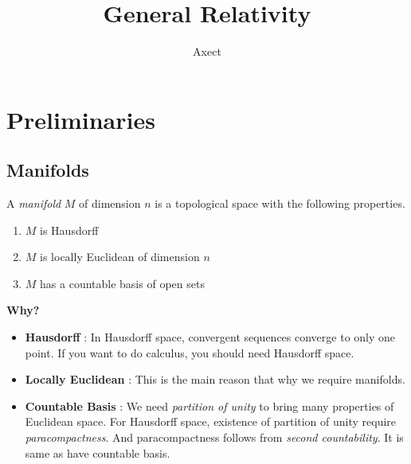 \documentclass[final]{IEEEphot}
\begin{document}
\title{General Relativity \\
\VS
{}}

\author{Axect}


\maketitle

\tableofcontents

\newpage

\section[Preliminaries]{Preliminaries}

\subsection{Manifolds}

\vs

\begin{tcolorbox}[colback=white!5!white,colframe=white!50!black, title=\textbf{Def 1.1 } Topological Manifolds]
  A \textit{manifold} $M$ of dimension $n$ is a topological space with the following properties.
  \begin{enumerate}
    \item $M$ is Hausdorff
    \item $M$ is locally Euclidean of dimension $n$
    \item $M$ has a countable basis of open sets
  \end{enumerate}
\end{tcolorbox}

\textbf{Why?}

\begin{itemize}
  \item \textbf{Hausdorff} : In Hausdorff space, convergent sequences converge to only one point.
  If you want to do calculus, you should need Hausdorff space.
  \item \textbf{Locally Euclidean} : This is the main reason that why we require manifolds.
  \item \textbf{Countable Basis} : We need \textit{partition of unity} to bring many properties of Euclidean space.
  For Hausdorff space, existence of partition of unity require \textit{paracompactness}.
  And paracompactness follows from \textit{second countability}. It is same as have countable basis.
\end{itemize}
\end{document}
